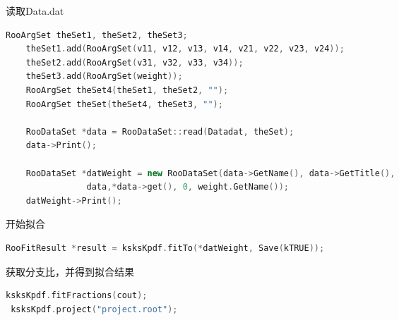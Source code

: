 \documentclass[11pt,a4paper]{article}
\begin{document}
\begin{CJK*}{UTF8}{gbsn}
读取Data.dat
\begin{lstlisting}[language=c++]
RooArgSet theSet1, theSet2, theSet3;
    theSet1.add(RooArgSet(v11, v12, v13, v14, v21, v22, v23, v24));
    theSet2.add(RooArgSet(v31, v32, v33, v34));
    theSet3.add(RooArgSet(weight));
    RooArgSet theSet4(theSet1, theSet2, "");
    RooArgSet theSet(theSet4, theSet3, "");

    RooDataSet *data = RooDataSet::read(Datadat, theSet);
    data->Print();

    RooDataSet *datWeight = new RooDataSet(data->GetName(), data->GetTitle(),
                data,*data->get(), 0, weight.GetName());
    datWeight->Print();
\end{lstlisting}
开始拟合
\begin{lstlisting}[language=c++]
 RooFitResult *result = ksksKpdf.fitTo(*datWeight, Save(kTRUE));
\end{lstlisting}
获取分支比，并得到拟合结果
\begin{lstlisting}[language=c++]
 ksksKpdf.fitFractions(cout);
 ksksKpdf.project("project.root");
\end{lstlisting}

\end{CJK*}
\end{document}
